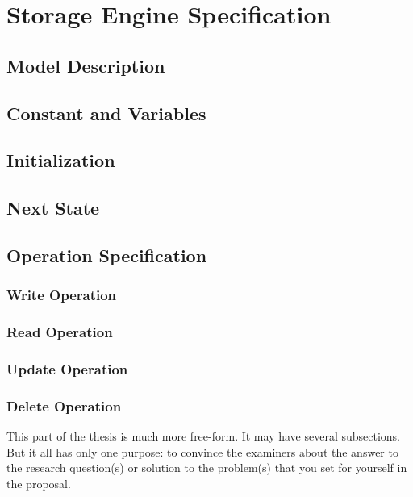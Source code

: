 \documentclass[11pt,a4paper,oneside]{book} %
\numberwithin{equation}{section}
\begin{document}
\chapter{Storage Engine Specification}

\section{Model Description}

\section{Constant and Variables}

\section{Initialization}

\section{Next State}



\section{Operation Specification }

\subsection{Write Operation}

\subsection{Read Operation}

\subsection{Update Operation}

\subsection{Delete Operation}

\label{c-methods}

This part of the thesis is much more free-form. It may have several subsections. But it all has only one purpose: to convince the examiners about the answer to the research question(s) or solution to the problem(s) that you set for yourself in the proposal.
\end{document}
